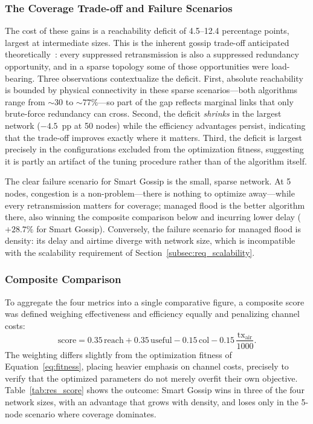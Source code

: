 \documentclass[english,bachelor]{tfgitic}[2026/01/22]
\begin{document}
\subsubsection{The Coverage Trade-off and Failure Scenarios}
 
The cost of these gains is a reachability deficit of 4.5--12.4 percentage points, largest at intermediate sizes. This is the inherent gossip trade-off anticipated theoretically~\cite{haas2006gossip}: every suppressed retransmission is also a suppressed redundancy opportunity, and in a sparse topology some of those opportunities were load-bearing. Three observations contextualize the deficit. First, absolute reachability is bounded by physical connectivity in these sparse scenarios---both algorithms range from ${\sim}30$ to ${\sim}77\%$---so part of the gap reflects marginal links that only brute-force redundancy can cross. Second, the deficit \emph{shrinks} in the largest network ($-4.5$~pp at 50 nodes) while the efficiency advantages persist, indicating that the trade-off improves exactly where it matters. Third, the deficit is largest precisely in the configurations excluded from the optimization fitness, suggesting it is partly an artifact of the tuning procedure rather than of the algorithm itself.
 
The clear failure scenario for Smart Gossip is the small, sparse network. At 5 nodes, congestion is a non-problem---there is nothing to optimize away---while every retransmission matters for coverage; managed flood is the better algorithm there, also winning the composite comparison below and incurring lower delay ($+28.7\%$ for Smart Gossip). Conversely, the failure scenario for managed flood is density: its delay and airtime diverge with network size, which is incompatible with the scalability requirement of Section~\ref{subsec:req_scalability}.
 
\subsubsection{Composite Comparison}
 
To aggregate the four metrics into a single comparative figure, a composite score was defined weighing effectiveness and efficiency equally and penalizing channel costs:
\begin{equation}
    \text{score} = 0.35\,\text{reach} + 0.35\,\text{useful} - 0.15\,\text{col} - 0.15\,\frac{\text{tx}_{\text{air}}}{1000}.
    \label{eq:composite}
\end{equation}
The weighting differs slightly from the optimization fitness of Equation~\eqref{eq:fitness}, placing heavier emphasis on channel costs, precisely to verify that the optimized parameters do not merely overfit their own objective. Table~\ref{tab:res_score} shows the outcome: Smart Gossip wins in three of the four network sizes, with an advantage that grows with density, and loses only in the 5-node scenario where coverage dominates.
 
\end{document}
